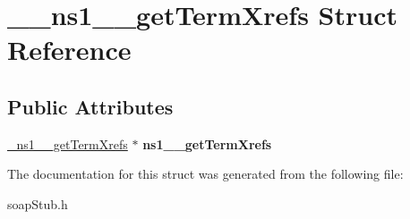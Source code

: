 \hypertarget{struct____ns1____getTermXrefs}{
\section{\_\-\_\-ns1\_\-\_\-getTermXrefs Struct Reference}
\label{struct____ns1____getTermXrefs}
}
\subsection*{Public Attributes}
\begin{DoxyCompactItemize}
\item 
\hypertarget{struct____ns1____getTermXrefs_a4bc860751524d8ec7526f077ef2dfa19}{
\hyperlink{class__ns1____getTermXrefs}{\_\-ns1\_\-\_\-getTermXrefs} $\ast$ {\bfseries ns1\_\-\_\-getTermXrefs}}
\label{struct____ns1____getTermXrefs_a4bc860751524d8ec7526f077ef2dfa19}

\end{DoxyCompactItemize}


The documentation for this struct was generated from the following file:\begin{DoxyCompactItemize}
\item 
soapStub.h\end{DoxyCompactItemize}
